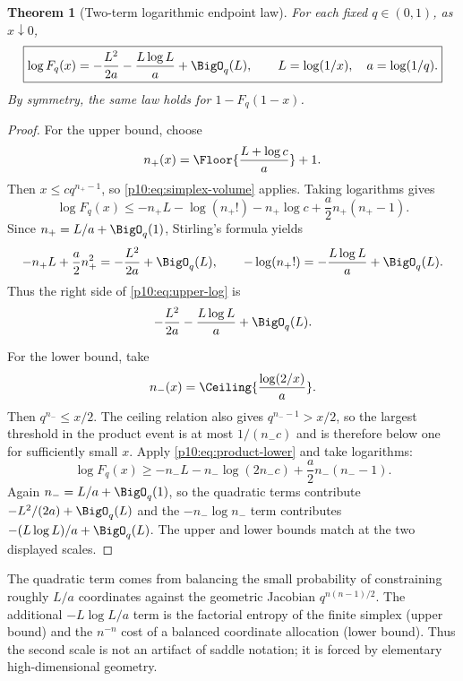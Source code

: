 \documentclass[11pt]{article}
\numberwithin{equation}{section}
\newtheorem{theorem}{Theorem}[section]
\theoremstyle{definition}
\theoremstyle{remark}
\begin{document}
\begin{theorem}[Two-term logarithmic endpoint law]
\label{p10:thm:endpoint}
For each fixed $q\in(0,1)$, as $x\downarrow0$,
\begin{equation}
 \boxed{\displaystyle
 \log F_q(x)
 =-\frac{L^2}{2a}-\frac{L\log L}{a}+\BigO_q(L),
 \qquad L=\log(1/x),\quad a=\log(1/q).}                     \label{p10:eq:endpoint-main}
\end{equation}
By symmetry, the same law holds for $1-F_q(1-x)$.
\end{theorem}

\begin{proof}
For the upper bound, choose
\[
 n_+(x)=\Floor{\frac{L+\log c}{a}}+1.
\]
Then $x\le cq^{n_+-1}$, so \eqref{p10:eq:simplex-volume} applies.  Taking logarithms gives
\begin{equation}
 \log F_q(x)
 \le-n_+L-\log(n_+!)-n_+\log c+\frac{a}{2}n_+(n_+-1).       \label{p10:eq:upper-log}
\end{equation}
Since $n_+=L/a+\BigO_q(1)$, Stirling's formula yields
\[
 -n_+L+\frac{a}{2}n_+^2=-\frac{L^2}{2a}+\BigO_q(L),
 \qquad
 -\log(n_+!)=-\frac{L\log L}{a}+\BigO_q(L).
\]
Thus the right side of \eqref{p10:eq:upper-log} is
\[
 -\frac{L^2}{2a}-\frac{L\log L}{a}+\BigO_q(L).
\]

For the lower bound, take
\[
 n_-(x)=\Ceiling{\frac{\log(2/x)}{a}}.
\]
Then $q^{n_-}\le x/2$.  The ceiling relation also gives
$q^{n_--1}>x/2$, so the largest threshold in the product event is at most
$1/(n_-c)$ and is therefore below one for sufficiently small $x$.  Apply
\eqref{p10:eq:product-lower} and take logarithms:
\begin{equation}
 \log F_q(x)
 \ge-n_-L-n_-\log(2n_-c)+\frac{a}{2}n_-(n_--1).             \label{p10:eq:lower-log}
\end{equation}
Again $n_-=L/a+\BigO_q(1)$, so the quadratic terms contribute
$-L^2/(2a)+\BigO_q(L)$ and the $-n_-\log n_-$ term contributes
$-(L\log L)/a+\BigO_q(L)$.  The upper and lower bounds match at the two displayed scales.
\end{proof}

\begin{remark}
The quadratic term comes from balancing the small probability of constraining roughly
$L/a$ coordinates against the geometric Jacobian $q^{n(n-1)/2}$.  The additional
$-L\log L/a$ term is the factorial entropy of the finite simplex (upper bound) and the
$n^{-n}$ cost of a balanced coordinate allocation (lower bound).  Thus the second scale is
not an artifact of saddle notation; it is forced by elementary high-dimensional geometry.
\end{remark}
\end{document}
